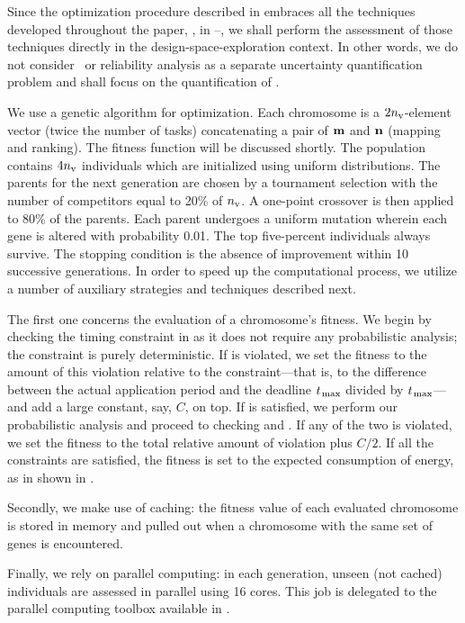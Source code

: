 Since the optimization procedure described in  embraces all the techniques developed throughout the paper, \ie, in --, we shall perform the assessment of those techniques directly in the design-space-exploration context.
In other words, we do not consider \ta\ or reliability analysis as a separate uncertainty quantification problem and shall focus on the quantification of .

We use a genetic algorithm for optimization.
Each chromosome is a $2 {n_\text{v}}$-element vector (twice the number of tasks) concatenating a pair of $\mathbf{m}$ and $\mathbf{n}$ (mapping and ranking).
The fitness function will be discussed shortly.
The population contains $4 {n_\text{v}}$ individuals which are initialized using uniform distributions.
The parents for the next generation are chosen by a tournament selection with the number of competitors equal to 20\% of ${n_\text{v}}$.
A one-point crossover is then applied to 80\% of the parents.
Each parent undergoes a uniform mutation wherein each gene is altered with probability 0.01.
The top five-percent individuals always survive.
The stopping condition is the absence of improvement within 10 successive generations.
In order to speed up the computational process, we utilize a number of auxiliary strategies and techniques described next.

The first one concerns the evaluation of a chromosome's fitness.
We begin by checking the timing constraint in  as it does not require any probabilistic analysis; the constraint is purely deterministic.
If  is violated, we set the fitness to the amount of this violation relative to the constraint---that is, to the difference between the actual application period and the deadline $t_{\text{\kern0.1emmax}}$ divided by $t_{\text{\kern0.1emmax}}$---and add a large constant, say, $C$, on top.
If  is satisfied, we perform our probabilistic analysis and proceed to checking  and .
If any of the two is violated, we set the fitness to the total relative amount of violation plus $C/2$.
If all the constraints are satisfied, the fitness is set to the expected consumption of energy, as in shown in .

Secondly, we make use of caching: the fitness value of each evaluated chromosome is stored in memory and pulled out when a chromosome with the same set of genes is encountered.

Finally, we rely on parallel computing: in each generation, unseen (not cached) individuals are assessed in parallel using 16  cores.
This job is delegated to the parallel computing toolbox available in  \cite{matlab}.
